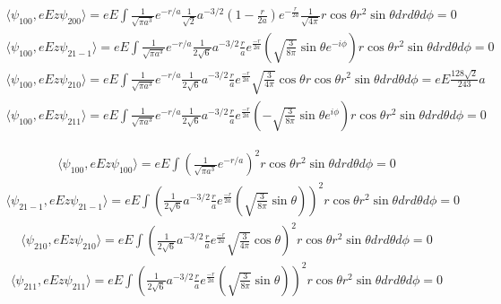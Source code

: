 \begin{align*}
    \langle
    \psi_{100}, eEz
    \psi_{200}
    \rangle  =
    eE\int
    \frac{1}{\sqrt{\pi a^3}}e^{-r/a}
    \frac{1}{\sqrt{2}}a^{-3/2}\left(1 - \frac{r}{2a}\right)e^{-\frac{r}{2a}}\frac{1}{\sqrt{4\pi}}r\cos\theta
    r^2\sin\theta drd\theta d\phi = 0
\end{align*}
\begin{align*}
    \langle
    \psi_{100}, eEz
    \psi_{21-1}
    \rangle  =
    eE\int
    \frac{1}{\sqrt{\pi a^3}}e^{-r/a}
    \frac{1}{2\sqrt{6}}a^{-3/2}\frac{r}{a}
    e^{\frac{-r}{2a}}
    \left(
    \sqrt{\frac{3}{8\pi}}\sin\theta e^{-i\phi}
    \right)r\cos\theta
    r^2\sin\theta drd\theta d\phi = 0
\end{align*}
\begin{align*}
    \langle
    \psi_{100}, eEz
    \psi_{210}
    \rangle  =
    eE\int
    \frac{1}{\sqrt{\pi a^3}}e^{-r/a}
    \frac{1}{2\sqrt{6}}a^{-3/2}\frac{r}{a}
    e^{\frac{-r}{2a}}
    \sqrt{\frac{3}{4\pi}}\cos\theta
    r\cos\theta
    r^2\sin\theta drd\theta d\phi =
    eE\frac{128\sqrt{2}}{243}a
\end{align*}
\begin{align*}
    \langle
    \psi_{100}, eEz
    \psi_{211}
    \rangle  =
    eE\int
    \frac{1}{\sqrt{\pi a^3}}e^{-r/a}
    \frac{1}{2\sqrt{6}}a^{-3/2}\frac{r}{a}
    e^{\frac{-r}{2a}}
    \left(-
    \sqrt{\frac{3}{8\pi}}\sin\theta e^{i\phi}
    \right)r\cos\theta
    r^2\sin\theta drd\theta d\phi = 0
\end{align*}



\begin{align*}
    \langle
    \psi_{100}, eEz
    \psi_{100}
    \rangle  =
    eE\int
    \left(\frac{1}{\sqrt{\pi a^3}}e^{-r/a}\right)^2
    r\cos\theta
    r^2\sin\theta drd\theta d\phi = 0
\end{align*}
\begin{align*}
    \langle
    \psi_{21-1}, eEz
    \psi_{21-1}
    \rangle  =
    eE\int
    \left(\frac{1}{2\sqrt{6}}a^{-3/2}\frac{r}{a}
    e^{\frac{-r}{2a}}
    \left(
    \sqrt{\frac{3}{8\pi}}\sin\theta
    \right)
    \right)^2
    r\cos\theta
    r^2\sin\theta drd\theta d\phi = 0
\end{align*}
\begin{align*}
    \langle
    \psi_{210}, eEz
    \psi_{210}
    \rangle  =
    eE\int
    \left(
    \frac{1}{2\sqrt{6}}a^{-3/2}\frac{r}{a}
    e^{\frac{-r}{2a}}
    \sqrt{\frac{3}{4\pi}}\cos\theta
    \right)^2
    r\cos\theta
    r^2\sin\theta drd\theta d\phi =
    0
\end{align*}
\begin{align*}
    \langle
    \psi_{211}, eEz
    \psi_{211}
    \rangle  =
    eE\int
    \left(
    \frac{1}{2\sqrt{6}}a^{-3/2}\frac{r}{a}
    e^{\frac{-r}{2a}}
    \left(
    \sqrt{\frac{3}{8\pi}}\sin\theta
    \right)
    \right)^2r\cos\theta
    r^2\sin\theta drd\theta d\phi = 0
\end{align*}

